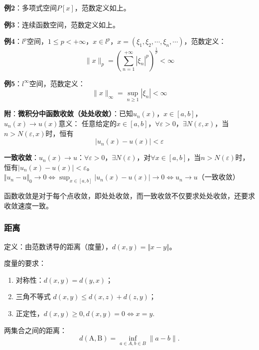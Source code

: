 \documentclass[12pt,a4paper]{article}
\begin{document}
\textbf{例2}：多项式空间$P[x]$，范数定义如上。

\textbf{例3}：连续函数空间，范数定义如上。

\textbf{例4}：$l^p$空间，$1\leq p < +\infty$，$x\in l^p$，$x=\left(\xi_{1}, \xi_{2}, \cdots, \xi_{n}, \cdots\right)$，范数定义：
\begin{equation}
\|x\|_{p}=\left(\sum_{n=1}^{+\infty}\left|\xi_{n}\right|^{p}\right)^{\frac{1}{p}}<\infty
\end{equation}

\textbf{例5}：$l^{\infty}$空间，范数定义：
\begin{equation}
\|x\|_{\infty}=\sup _{n \geq 1}\left|\xi_{n}\right|<\infty
\end{equation}

\textbf{附}：\textbf{微积分中函数收敛（处处收敛）}：已知$u_n(x)$，$x\in [a,b]$，$u_n(x)\rightarrow u(x)$意义：
任意给定的$x\in [a,b]$，$\forall \varepsilon>0$，$\exists N(\varepsilon,x)$，当$n>N(\varepsilon,x)$时，恒有
\begin{equation}
	\vert u_n(x)-u(x)\vert <\varepsilon
\end{equation}

\textbf{一致收敛}：$u_n(x)\rightarrow u$：$\forall\varepsilon>0$，$\exists N(\varepsilon)$，对$\forall x\in [a,b]$，当$n>N(\varepsilon)$时，恒有$\vert u_n(x)-u(x)\vert<\varepsilon$。
$\Vert u_n-u \Vert_0\rightarrow 0\Leftrightarrow\sup _{x \in[a, b]}\left|u _n(x)-u(x)\right|\rightarrow 0\Leftrightarrow u_{n} \rightarrow u$（一致收敛）

函数收敛是对于每个点收敛，即处处收敛，而一致收敛不仅要求处处收敛，还要求收敛速度一致。
\subsubsection{距离}
定义：由范数诱导的距离（度量），$d(x,y)=\Vert x-y\Vert$。

度量的要求：

\begin{enumerate}
	\item 对称性：$d(x,y)=d(y,x)$；
	\item 三角不等式 $d(x,y)\leq d(x,z)+d(z,y)$；
	\item 正定性，$d(x,y)\geq 0,d(x,y)=0\Leftrightarrow x=y$.
\end{enumerate}

两集合之间的距离：
\begin{equation}
	{d}(\mathrm{A}, \mathrm{B})=\inf _{a \in A, b \in B}\|a-b\| .
\end{equation}
\end{document}
